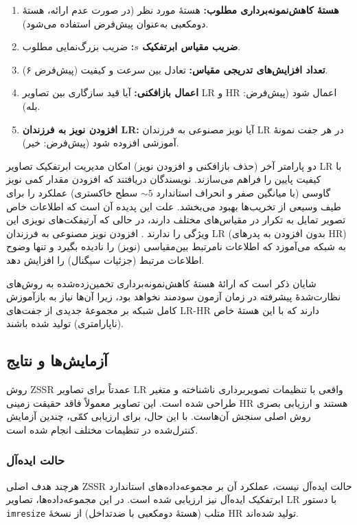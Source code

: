 \begin{enumerate}
\item \textbf{هستهٔ کاهش‌نمونه‌برداری مطلوب:} هستهٔ مورد نظر
(در صورت عدم ارائه، هستهٔ دومکعبی به‌عنوان پیش‌فرض استفاده می‌شود).
\item \textbf{ضریب مقیاس ابرتفکیک $s$:} ضریب بزرگ‌نمایی مطلوب.
\item \textbf{تعداد افزایش‌های تدریجی مقیاس:} تعادل بین سرعت و
کیفیت (پیش‌فرض ۶).
\item \textbf{اعمال بازافکنی:} آیا قید سازگاری بین تصاویر LR و HR
اعمال شود (پیش‌فرض: بله).
\item \textbf{افزودن نویز به فرزندان LR:} آیا نویز مصنوعی به
فرزندان LR در هر جفت نمونهٔ آموزشی افزوده شود (پیش‌فرض: خیر).
\end{enumerate}

دو پارامتر آخر (حذف بازافکنی و افزودن نویز) امکان مدیریت ابرتفکیک
تصاویر LR با کیفیت پایین را فراهم می‌سازند. نویسندگان دریافتند که
افزودن مقدار کمی نویز گاوسی (با میانگین صفر و انحراف استاندارد
$\sim 5$ سطح خاکستری) عملکرد را برای طیف وسیعی از تخریب‌ها بهبود
می‌بخشد. علت این پدیده آن است که اطلاعات خاص تصویر تمایل به تکرار
در مقیاس‌های مختلف دارند، در حالی که آرتیفکت‌های نویزی این ویژگی
را ندارند \cite{zontak2013separating}. افزودن نویز مصنوعی به
فرزندان LR (بدون افزودن به پدرهای HR) به شبکه می‌آموزد که
اطلاعات نامرتبط بین‌مقیاسی (نویز) را نادیده بگیرد و تنها وضوح
اطلاعات مرتبط (جزئیات سیگنال) را افزایش دهد.

شایان ذکر است که ارائهٔ هستهٔ کاهش‌نمونه‌برداری تخمین‌زده‌شده به
روش‌های نظارت‌شدهٔ پیشرفته در زمان آزمون سودمند نخواهد بود، زیرا
آن‌ها نیاز به بازآموزش کامل شبکه بر مجموعهٔ جدیدی از جفت‌های
LR-HR دارند که با این هستهٔ خاص (ناپارامتری) تولید شده باشند.

\subsection{آزمایش‌ها و نتایج}
\label{subsec:zssr_experiments}

روش ZSSR عمدتاً برای تصاویر LR واقعی با تنظیمات تصویربرداری ناشناخته
و متغیر طراحی شده است. این تصاویر معمولاً فاقد حقیقت زمینی HR هستند
و ارزیابی بصری روش اصلی سنجش آن‌هاست. با این حال، برای ارزیابی کمّی،
چندین آزمایش کنترل‌شده در تنظیمات مختلف انجام شده است.

\subsubsection{حالت ایده‌آل}

هرچند هدف اصلی ZSSR حالت ایده‌آل نیست، عملکرد آن بر مجموعه‌داده‌های
استاندارد ابرتفکیک ایده‌آل نیز ارزیابی شده است. در این
مجموعه‌داده‌ها، تصاویر LR با دستور \texttt{imresize} متلب (هستهٔ
دومکعبی با ضدتداخل) از نسخهٔ HR تولید شده‌اند.

